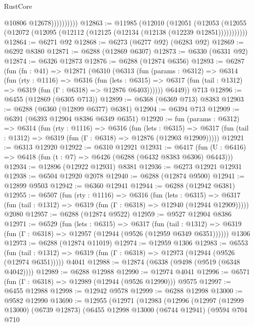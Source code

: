 \begin{lexlean}{RustCore}
\begin{coremodule}
                        @10806
                        @12678))))))))))
@12863 := @11985
    (@12010
      (@12051
        (@12053 (@12055 (@12072 (@12095 (@12112 (@12125 (@12134 (@12138 (@12239 @12851)))))))))))
@12864 := @6271 @92
@12868 := @6273 (@6277 @92) (@6283 @92)
@12869 := @6292 @8380
@12871 := @6288 (@12869 @6307)
@12873 := @6330 (@6331 @92)
@12874 := @6326 @12873
@12876 := @6288 (@12874 @6356)
@12893 := @6287
    (fun (fn : @41) =>
    @12871
      (@6310
        (@6313
          (fun (params : @6312) =>
          @6314
            (fun (rty : @1116) =>
            @6316
              (fun (lets : @6315) =>
              @6317 (fun (tail : @1312) => @6319 (fun (Γ : @6318) => @12876 @6403))))))
        @6449))
    @713
@12896 := @6455 (@12869 (@6305 @713))
@12899 := @6368 (@6369 @713) @8383
@12903 := @6288 (@6360 (@12899 @6377) @6381)
@12904 := @6394 @713
@12909 := @6391 (@6393 @12904 @8386 @6349 @6351)
@12920 := fun (params : @6312) =>
  @6314
    (fun (rty : @1116) =>
    @6316
      (fun (lets : @6315) =>
      @6317 (fun (tail : @1312) => @6319 (fun (Γ : @6318) => @12876 (@12903 @12909)))))
@12921 := @6313 @12920
@12922 := @6310 @12921
@12931 := @6417 (fun (U : @6416) => @6418 (fun (t : @7) => @6426 (@6288 (@6432 @8383 @6306) @6443)))
@12934 := @12896 (@12922 @12931) @8381
@12936 := @6273 @12921 @12931
@12938 := @6504 @12920 @2078
@12940 := @6288 (@12874 @9500)
@12941 := @12899 @9503
@12942 := @6360 @12941
@12944 := @6288 (@12942 @6381)
@12955 := @6507
    (fun (rty : @1116) =>
    @6316
      (fun (lets : @6315) =>
      @6317 (fun (tail : @1312) => @6319 (fun (Γ : @6318) => @12940 (@12944 @12909)))))
    @2080
@12957 := @6288 (@12874 @9522)
@12959 := @9527 @12904 @8386
@12971 := @6529
    (fun (lets : @6315) =>
    @6317
      (fun (tail : @1312) =>
      @6319 (fun (Γ : @6318) => @12957 (@12944 (@9526 (@12959 @6349 @6351))))))
    @1306
@12973 := @6288 (@12874 @11019)
@12974 := @12959 @1306
@12983 := @6553
    (fun (tail : @1312) => @6319 (fun (Γ : @6318) => @12973 (@12944 (@9526 (@12974 @6351)))))
    @4041
@12988 := @12874 (@6338 (@9498 (@9519 (@6348 @4042))))
@12989 := @6288 @12988
@12990 := @12974 @4041
@12996 := @6571 (fun (Γ : @6318) => @12989 (@12944 (@9526 @12990))) @9575
@12997 := @6455 @12988
@12998 := @12942 @9578
@12999 := @6288 @12998
@13000 := @9582 @12990
@13690 := @12955
    (@12971
      (@12983
        (@12996
          (@12997
            (@12999 @13000)
            (@6739 @12873)
            (@6455
              @12998
              @13000
              (@6744 @12941)
              (@9594
                @704
                @710

\end{coremodule}
\end{lexlean}
